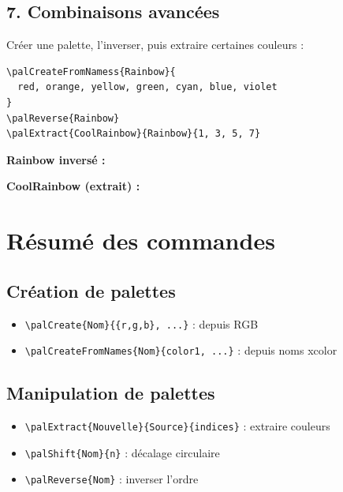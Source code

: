 \documentclass{article}
\begin{document}
\subsection*{7. Combinaisons avancées}

Créer une palette, l'inverser, puis extraire certaines couleurs :

\begin{verbatim}
\palCreateFromNamess{Rainbow}{
  red, orange, yellow, green, cyan, blue, violet
}
\palReverse{Rainbow}
\palExtract{CoolRainbow}{Rainbow}{1, 3, 5, 7}
\end{verbatim}


\bigskip

\textbf{Rainbow inversé :} 

\bigskip

\textbf{CoolRainbow (extrait) :} 

\section*{Résumé des commandes}

\subsection*{Création de palettes}
\begin{itemize}
\item \texttt{\textbackslash palCreate\{Nom\}\{\{r,g,b\}, ...\}} : depuis RGB
\item \texttt{\textbackslash palCreateFromNames\{Nom\}\{color1, ...\}} : depuis noms xcolor
\end{itemize}

\subsection*{Manipulation de palettes}
\begin{itemize}
\item \texttt{\textbackslash palExtract\{Nouvelle\}\{Source\}\{indices\}} : extraire couleurs
\item \texttt{\textbackslash palShift\{Nom\}\{n\}} : décalage circulaire
\item \texttt{\textbackslash palReverse\{Nom\}} : inverser l'ordre
\end{itemize}
\end{document}
